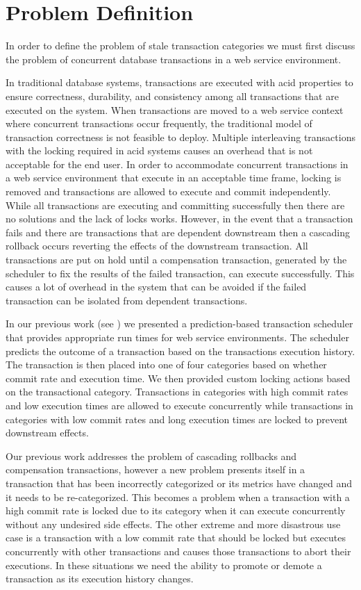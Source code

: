 \section{Problem Definition}
\label{sec:problem_definition}

In order to define the problem of stale transaction categories we must first discuss the problem of concurrent database transactions in a web service environment.

In traditional database systems, transactions are executed with \gls{acid} properties to ensure correctness, durability, and consistency among all transactions that are executed on the system. When transactions are moved to a web service context where concurrent transactions occur frequently, the traditional model of transaction correctness is not feasible to deploy. Multiple interleaving transactions with the locking required in \gls{acid} systems causes an overhead that is not acceptable for the end user. In order to accommodate concurrent transactions in a web service environment that execute in an acceptable time frame, locking is removed and transactions are allowed to execute and commit independently. While all transactions are executing and committing successfully then there are no solutions and the lack of locks works. However, in the event that a transaction fails and there are transactions that are dependent downstream then a cascading rollback occurs reverting the effects of the downstream transaction. All transactions are put on hold until a compensation transaction, generated by the scheduler to fix the results of the failed transaction, can execute successfully. This causes a lot of overhead in the system that can be avoided if the failed transaction can be isolated from dependent transactions.

In our previous work (see \cite{ravan_ensuring_2020}) we presented a prediction-based transaction scheduler that provides appropriate run times for web service environments. The scheduler predicts the outcome of a transaction based on the transactions execution history. The transaction is then placed into one of four categories based on whether commit rate and execution time. We then provided custom locking actions based on the transactional category. Transactions in categories with high commit rates and low execution times are allowed to execute concurrently while transactions in categories with low commit rates and long execution times are locked to prevent downstream effects.

Our previous work addresses the problem of cascading rollbacks and compensation transactions, however a new problem presents itself in a transaction that has been incorrectly categorized or its metrics have changed and it needs to be re-categorized. This becomes a problem when a transaction with a high commit rate is locked due to its category when it can execute concurrently without any undesired side effects. The other extreme and more disastrous use case is a transaction with a low commit rate that should be locked but executes concurrently with other transactions and causes those transactions to abort their executions. In these situations we need the ability to promote or demote a transaction as its execution history changes. 


